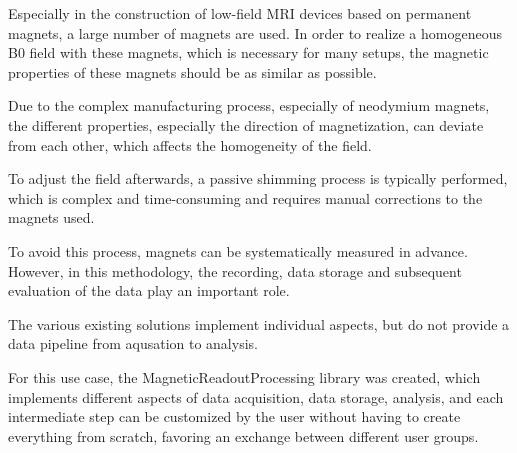 Especially in the construction of low-field MRI devices based on
permanent magnets, a large number of magnets are used. In order to
realize a homogeneous B0 field with these magnets, which is necessary
for many setups, the magnetic properties of these magnets should be as
similar as possible.

Due to the complex manufacturing process, especially of neodymium
magnets, the different properties, especially the direction of
magnetization, can deviate from each other, which affects the
homogeneity of the field.

To adjust the field afterwards, a passive shimming process is typically
performed, which is complex and time-consuming and requires manual
corrections to the magnets used.

To avoid this process, magnets can be systematically measured in
advance. However, in this methodology, the recording, data storage and
subsequent evaluation of the data play an important role.

The various existing solutions implement individual aspects, but do not
provide a data pipeline from aqusation to analysis.

For this use case, the MagneticReadoutProcessing library was created,
which implements different aspects of data acquisition, data storage,
analysis, and each intermediate step can be customized by the user
without having to create everything from scratch, favoring an exchange
between different user groups.
